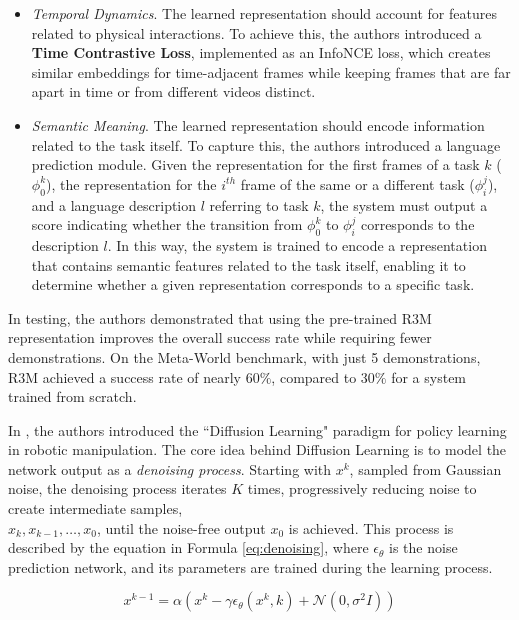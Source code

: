 \begin{itemize}
    \item \textit{Temporal Dynamics}. The learned representation should account for features related to physical interactions. To achieve this, the authors introduced a \textbf{Time Contrastive Loss}, implemented as an InfoNCE loss, which creates similar embeddings for time-adjacent frames while keeping frames that are far apart in time or from different videos distinct.
    \item \textit{Semantic Meaning}. The learned representation should encode information related to the task itself. To capture this, the authors introduced a language prediction module. Given the representation for the first frames of a task $k$ ($\phi^{k}_{0}$), the representation for the $i^{th}$ frame of the same or a different task ($\phi^{j}_{i}$), and a language description $l$ referring to task $k$, the system must output a score indicating whether the transition from $\phi^{k}_{0}$ to $\phi^{j}_{i}$ corresponds to the description $l$. In this way, the system is trained to encode a representation that contains semantic features related to the task itself, enabling it to determine whether a given representation corresponds to a specific task.
\end{itemize}

In testing, the authors demonstrated that using the pre-trained R3M representation improves the overall success rate while requiring fewer demonstrations. On the Meta-World benchmark, with just 5 demonstrations, R3M achieved a success rate of nearly \textbf{$60\%$}, compared to \textbf{$30\%$} for a system trained from scratch.


In \cite{cheng2023diffusion}, the authors introduced the ``Diffusion Learning" paradigm for policy learning in robotic manipulation. The core idea behind Diffusion Learning is to model the network output as a \textit{denoising process}. Starting with $x^k$, sampled from Gaussian noise, the denoising process iterates $K$ times, progressively reducing noise to create intermediate samples, \\ $x_k, x_{k-1}, \dots, x_0$, until the noise-free output $x_0$ is achieved. This process is described by the equation in Formula \ref{eq:denoising}, where $\epsilon_{\theta}$ is the noise prediction network, and its parameters are trained during the learning process.

\begin{equation}
    \label{eq:denoising}
    x^{k-1} = \alpha \left( x^k - \gamma \epsilon_{\theta}(x^k, k) + \mathcal{N}(0, \sigma^{2}I)\right)
\end{equation}


